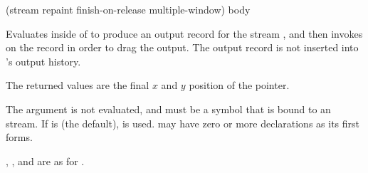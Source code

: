  {(\optional stream
                              \key repaint finish-on-release multiple-window)
                             \body body}

Evaluates  inside of  to produce an
output record for the stream , and then invokes
 on the record in order to drag the output.  The output
record is not inserted into 's output history.

The returned values are the final $x$ and $y$ position of the pointer.

The  argument is not evaluated, and must be a symbol that is bound
to an  stream.  If  is  (the
default),  is used.   may have zero or more
declarations as its first forms.

, , and  are as for
.
